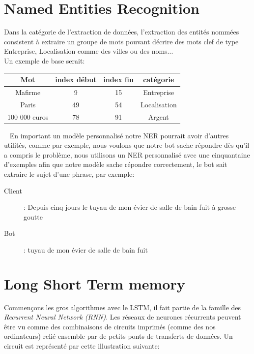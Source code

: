 \pagebreak
\section{Named Entities Recognition}
Dans la catégorie de l'extraction de données, l'extraction des entités nommées consistent à extraire un groupe de mots pouvant décrire des mots clef de type Entreprise, Localisation comme des villes ou des noms...\\
Un exemple de base serait:\\


\begin{tabular}{c|cc|c}
Mot & index début & index fin & catégorie \\
\hline
Mafirme & 9 & 15 & Entreprise\\
Paris & 49 & 54 & Localisation\\
100 000 euros & 78 & 91 & Argent\\
\end{tabular}

\ \linebreak
En important un modèle personnalisé notre NER pourrait avoir d'autres utilités, comme par exemple,  nous voulons que notre bot sache répondre dès qu'il  a compris le problème, nous utilisons un NER personnalisé avec une cinquantaine d'exemples afin que notre modèle sache répondre correctement, le bot sait extraire le sujet d'une phrase, par exemple:

\begin{description}
\item[Client]: Depuis cinq jours le tuyau de mon évier de salle de bain fuit à grosse goutte
\item[Bot]: tuyau de mon évier de salle de bain fuit
\end{description}

\pagebreak
\section{Long Short Term memory}
Commençons les gros algorithmes avec le LSTM, il fait partie de la famille des \textit{Recurrent Neural Network (RNN)}. Les réseaux de neurones récurrents peuvent être vu comme des combinaisons de circuits imprimés (comme des nos ordinateurs) relié ensemble par de petits ponts de transferts de données. 
Un circuit est représenté par cette illustration suivante:

